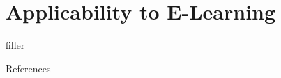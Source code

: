 \documentclass[en]{sdqbeamer}
\begin{document}
\section{Applicability to E-Learning}
\begin{frame}
	filler
\end{frame}

\begin{frame}{References}
	\printbibliography
\end{frame}


\end{document}
